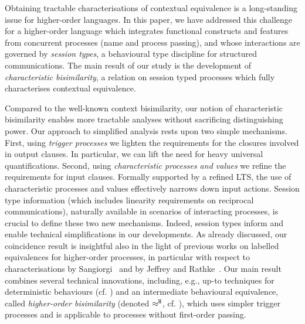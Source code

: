 
Obtaining tractable characterisations of contextual equivalence 
is a long-standing issue for higher-order  languages. 
In this paper, we have addressed this challenge for a higher-order language 
which integrates functional constructs and  features from concurrent processes (name and process passing), and 
whose interactions are governed by \emph{session types}, a behavioural type discipline for structured communications.
The main result of our study is the development of \emph{characteristic bisimilarity}, 
a relation on session typed processes which fully characterises contextual equivalence.

Compared to 
the well-known 
context bisimilarity, our notion of 
characteristic bisimilarity 
enables more tractable analyses without sacrificing distinguishing power. 
Our approach to simplified analysis rests upon two simple mechanisms. 
First, 
using \emph{trigger processes} 
we lighten the requirements for the closures involved in output clauses. 
In particular, we can lift the need for heavy universal quantifications. 
Second, using \emph{characteristic processes and values} we refine the requirements for input clauses.
Formally supported by a refined LTS, the use of characteristic processes and values effectively narrows down
input actions.
Session type information (which includes linearity requirements on reciprocal communications), naturally available in scenarios of interacting processes, is crucial to define these two new mechanisms. Indeed, session types inform and enable technical simplifications in our developments.
As already discussed, our coincidence result is insightful also in the light of previous works on labelled equivalences 
for higher-order processes, in particular with respect to characterisations 
by Sangiorgi~\cite{SangiorgiD:expmpa,San96H} and by Jeffrey and Rathke~\cite{JeffreyR05}. Our main result 
combines several technical innovations, including, e.g., 
up-to techniques for deterministic behaviours (cf. )
and an intermediate behavioural equivalence, called \emph{higher-order bisimilarity}
(denoted $\approx^\mathtt{H}$, cf. ), which 
uses simpler trigger processes and 
is applicable to processes without first-order passing. 

